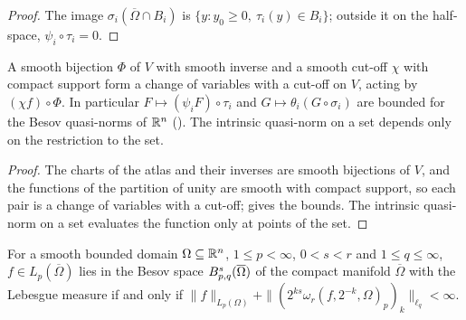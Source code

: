 \begin{proof}
\leanok
The image $\sigma_i(\overline{\Omega} \cap B_i)$ is $\{y : y_0 \geq 0,\ \tau_i(y) \in B_i\}$;
outside it on the half-space, $\psi_i \circ \tau_i = 0$.
\end{proof}

\begin{lemma}
\label{lem:global-changes}
\leanok
{}
A smooth bijection $\Phi$ of $V$ with smooth inverse and a smooth cut-off $\chi$ with compact
support form a change of variables with a cut-off on $V$, acting by $(\chi f) \circ \Phi$. In
particular $F \mapsto (\psi_i F) \circ \tau_i$ and $G \mapsto \theta_i (G \circ \sigma_i)$ are
bounded for the Besov quasi-norms of $\mathbb{R}^n$ (). The intrinsic
quasi-norm on a set depends only on the restriction to the set.
\end{lemma}

\begin{proof}
\leanok
The charts of the atlas and their inverses are smooth bijections of $V$, and the functions of
the partition of unity are smooth with compact support, so each pair is a change of variables
with a cut-off;  gives the bounds. The intrinsic quasi-norm on a set
evaluates the function only at points of the set.
\end{proof}

\begin{theorem}
\label{thm:smooth-domain-besov}
\leanok
{}
For a smooth bounded domain $\Omega \subseteq \mathbb{R}^n$, $1 \leq p < \infty$, $0 < s < r$ and
$1 \leq q \leq \infty$, $f \in L_p(\overline{\Omega})$ lies in the Besov space
$B^{s}_{p,q}(\overline{\Omega})$ of the compact manifold $\overline{\Omega}$ with the Lebesgue
measure if and only if
$\|f\|_{L_p(\Omega)} + \|(2^{ks} \omega_r(f, 2^{-k}, \Omega)_p)_k\|_{\ell_q} < \infty$.
\end{theorem}

